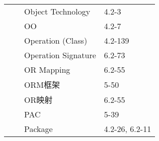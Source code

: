 \documentclass[twocolumn]{article}
\begin{document}
\begin{tabular}{ | >{\bfseries}m{0.5em} | >{\bfseries}m{1em} | m{12em} | m{8em} |}
 &  & Object Technology & 4.2-3\\ \cline{3-4}
 &  & OO & 4.2-7\\ \cline{3-4}
 &  & Operation (Class) & 4.2-139\\ \cline{3-4}
 &  & Operation Signature & 6.2-73\\ \cline{3-4}
 &  & OR Mapping & 6.2-55\\ \cline{3-4}
 &  & ORM框架 & 5-50\\ \cline{3-4}
 &  & OR映射 & 6.2-55\\ \cline{2-4}
 & \multirow{2}{1em}{P} & PAC & 5-39\\ \cline{3-4}
 &  & Package & 4.2-26, 6.2-11\\ \cline{1-4}
\end{tabular}
\begin{tabular}{ | >{\bfseries}m{0.5em} | >{\bfseries}m{1em} | m{12em} | m{8em} |} \cline{1-4}

\end{tabular}
\end{document}
